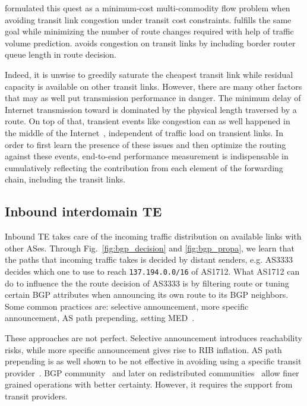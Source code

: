 \citet{Goldenberg2004} formulated this quest as a minimum-cost multi-commodity flow problem when avoiding transit link congestion under transit cost constraints.
\citet{Uhlig2004b} fulfills the same goal while minimizing the number of route changes required with help of traffic volume prediction.
\citet{Zhu2014} avoids congestion on transit links by including border router queue length in route decision.

Indeed, it is unwise to greedily saturate the cheapest transit link while residual capacity is available on other transit links.
However, there are many other factors that may as well put transmission performance in danger.
The minimum delay of Internet transmission toward is dominated by the physical length traversed by a route. 
On top of that, transient events like congestion can as well happened in the middle of the Internet~\cite{Akella2003, Luckie2014}, independent of traffic load on transient links.
In order to first learn the presence of these issues and then optimize the routing against these events, end-to-end performance measurement is indispensable in cumulatively reflecting the contribution from each element of the forwarding chain, including the transit links.


\subsection{Inbound interdomain TE}
Inbound TE takes care of the incoming traffic distribution on available links with other ASes.
Through Fig.~\ref{fig:bgp_decision} and \ref{fig:bgp_propa}, we learn that the paths that incoming traffic takes is decided by distant senders, e.g. AS3333 decides which one to use to reach \texttt{137.194.0.0/16} of AS1712.
What AS1712 can do to influence the the route decision of AS3333 is by 
filtering route or tuning certain BGP attributes when announcing its own route to its BGP neighbors.
Some common practices are: selective announcement, more specific announcement, AS path prepending, setting \ac{MED}~\cite{Wang2008}.

These approaches are not perfect. Selective announcement introduces reachability risks, while more specific announcement gives rise to \ac{RIB} inflation. AS path prepending is as well shown to be not effective in avoiding using a specific transit provider~\cite{Quoitin2004a}. BGP community~\cite{Donnet2008, Shao2015} and later on redistributed communities~\cite{Quoitin2002} allow finer grained operations with better certainty. However, it requires the support from transit providers. 

